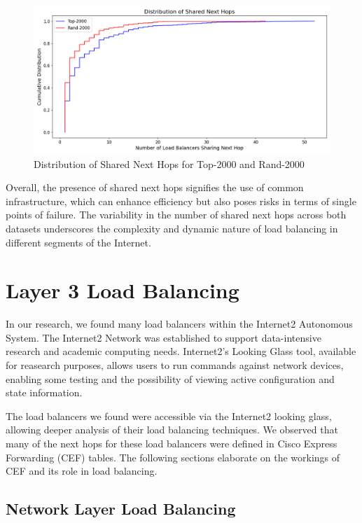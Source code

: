 \documentclass[12pt]{cwru_thesis}
\begin{document}
\begin{figure}[h!]
    \centering
    \includegraphics[width=\linewidth]{figures/shared_next_hops_combined.png}
    \caption{Distribution of Shared Next Hops for Top-2000 and Rand-2000}
    \label{fig:shared_next_hops_combined}
\end{figure}

Overall, the presence of shared next hops signifies the use of common infrastructure, which can enhance efficiency but also poses risks in terms of single points of failure. The variability in the number of shared next hops across both datasets underscores the complexity and dynamic nature of load balancing in different segments of the Internet.


\chapter{Layer 3 Load Balancing}
In our research, we found many load balancers within the Internet2 Autonomous System. The Internet2 Network was established to support data-intensive research and academic computing needs. Internet2's Looking Glass tool, available for reasearch purposes, allows users to run commands against network devices, enabling some testing and the possibility of viewing active configuration and state information.

The load balancers we found were accessible via the Internet2 looking glass, allowing deeper analysis of their load balancing techniques. We observed that many of the next hops for these load balancers were defined in Cisco Express Forwarding (CEF) tables. The following sections elaborate on the workings of CEF and its role in load balancing.

\section{Network Layer Load Balancing}
\end{document}
